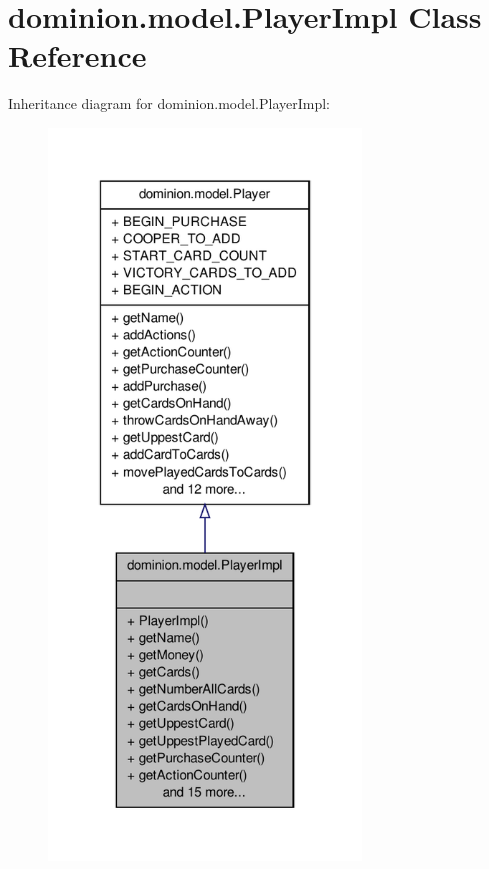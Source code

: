\hypertarget{classdominion_1_1model_1_1PlayerImpl}{\section{dominion.\-model.\-Player\-Impl \-Class \-Reference}
\label{classdominion_1_1model_1_1PlayerImpl}
}


\-Inheritance diagram for dominion.\-model.\-Player\-Impl\-:
\nopagebreak
\begin{figure}[H]
\begin{center}
\leavevmode
\includegraphics[height=550pt]{classdominion_1_1model_1_1PlayerImpl__inherit__graph}
\end{center}
\end{figure}


